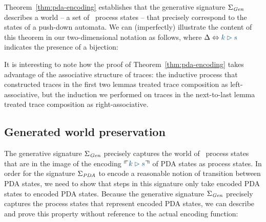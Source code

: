 Theorem~\ref{thm:pda-encoding} establishes that the generative
signature $\Sigma_{\it Gen}$ describes a world -- a set of
\sls~process states -- that precisely correspond to the states of a
push-down automata.  We can (imperfectly) illustrate the content of
this theorem in our two-dimensional notation as follows, where 
$\Delta \Leftrightarrow \obj{k \rhd s}$ indicates the presence of a
bijection:
\begin{center}
\end{center}

It is interesting to note how the proof of
Theorem~\ref{thm:pda-encoding} takes advantage of the associative
structure of traces: the inductive process that constructed traces in
the first two lemmas treated trace composition as left-associative,
but the induction we performed on traces in the next-to-last lemma
treated trace composition as right-associative.

\subsection{Generated world preservation}
\label{sec:sls-pda-preservation}

The generative signature $\Sigma_{\it Gen}$ precisely captures the
world of \sls~process states that are in the image of the encoding
$\ctxinterp{k \rhd s}$ of PDA states as process states. In order for
the signature $\Sigma_{\it PDA}$ to encode a reasonable notion of
transition between PDA states, we need to show that steps in this
signature only take encoded PDA states to encoded PDA states. Because 
the generative signature $\Sigma_{\it Gen}$ precisely captures the 
process states that represent encoded PDA states, we can describe
and prove this property without reference to the actual encoding function:
 
